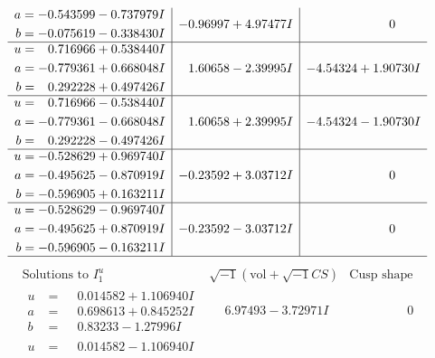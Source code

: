 \documentclass[1p]{elsarticle_modified}
\theoremstyle{definition}
\newcommand{\I}{\sqrt{-1}}
\begin{document}
$$\begin{array}{c|c|c}
\begin{aligned}
a &= -0.543599 - 0.737979 I \\
b &= -0.075619 - 0.338430 I\end{aligned}
 & -0.96997 + 4.97477 I & \phantom{-0.000000 } 0 \\ \hline\begin{aligned}
u &= \phantom{-}0.716966 + 0.538440 I \\
a &= -0.779361 + 0.668048 I \\
b &= \phantom{-}0.292228 + 0.497426 I\end{aligned}
 & \phantom{-}1.60658 - 2.39995 I & -4.54324 + 1.90730 I \\ \hline\begin{aligned}
u &= \phantom{-}0.716966 - 0.538440 I \\
a &= -0.779361 - 0.668048 I \\
b &= \phantom{-}0.292228 - 0.497426 I\end{aligned}
 & \phantom{-}1.60658 + 2.39995 I & -4.54324 - 1.90730 I \\ \hline\begin{aligned}
u &= -0.528629 + 0.969740 I \\
a &= -0.495625 - 0.870919 I \\
b &= -0.596905 + 0.163211 I\end{aligned}
 & -0.23592 + 3.03712 I & \phantom{-0.000000 } 0 \\ \hline\begin{aligned}
u &= -0.528629 - 0.969740 I \\
a &= -0.495625 + 0.870919 I \\
b &= -0.596905 - 0.163211 I\end{aligned}
 & -0.23592 - 3.03712 I & \phantom{-0.000000 } 0\\
 \hline 
 \end{array}$$\newpage$$\begin{array}{c|c|c}  
\text{Solutions to }I^u_{1}& \I (\text{vol} + \sqrt{-1}CS) & \text{Cusp shape}\\
 \hline 
\begin{aligned}
u &= \phantom{-}0.014582 + 1.106940 I \\
a &= \phantom{-}0.698613 + 0.845252 I \\
b &= \phantom{-}0.83233 - 1.27996 I\end{aligned}
 & \phantom{-}6.97493 - 3.72971 I & \phantom{-0.000000 } 0 \\ \hline\begin{aligned}
u &= \phantom{-}0.014582 - 1.106940 I \\

\end{aligned}
\end{array}$$
\end{document}
